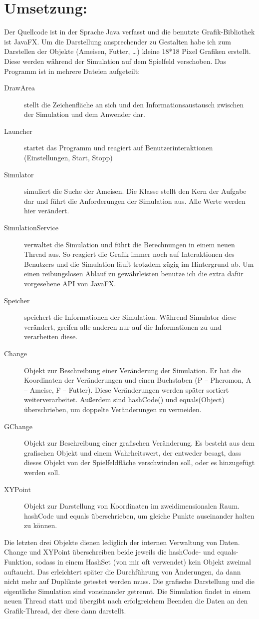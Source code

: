 \documentclass[a4paper,12pt]{scrartcl}
\begin{document}
\section*{Umsetzung:}
Der Quellcode ist in der Sprache Java verfasst und die benutzte Grafik-Bibliothek ist JavaFX.
Um die Darstellung ansprechender zu Gestalten habe ich zum Darstellen der Objekte (Ameisen, Futter, \dots) kleine 18*18 Pixel Grafiken erstellt. Diese werden während der Simulation auf dem Spielfeld verschoben.
Das Programm ist in mehrere Dateien aufgeteilt:
\begin{description}
 \item[DrawArea] stellt die Zeichenfläche an sich und den Informationsaustausch zwischen der Simulation und dem Anwender dar.
 \item[Launcher] startet das Programm und reagiert auf Benutzerinteraktionen (Einstellungen, Start, Stopp)
 \item[Simulator] simuliert die Suche der Ameisen. Die Klasse stellt den Kern der Aufgabe dar und führt die Anforderungen der Simulation aus. Alle Werte werden hier verändert.
 \item[SimulationService] verwaltet die Simulation und führt die Berechnungen in einem neuen Thread aus. So reagiert die Grafik immer noch auf Interaktionen des Benutzers und die Simulation läuft trotzdem zügig im Hintergrund ab. Um einen reibungslosen Ablauf zu gewährleisten benutze ich die extra dafür vorgesehene API von JavaFX.
 \item[Speicher] speichert die Informationen der Simulation. Während Simulator diese verändert, greifen alle anderen nur auf die Informationen zu und verarbeiten diese.
 \item[Change] Objekt zur Beschreibung einer Veränderung der Simulation. Er hat die Koordinaten der Veränderungen und einen Buchstaben (P -- Pheromon, A -- Ameise, F -- Futter). Diese Veränderungen werden später sortiert weiterverarbeitet. Außerdem sind hashCode() und equals(Object) überschrieben, um doppelte Veränderungen zu vermeiden.
 \item[GChange] Objekt zur Beschreibung einer grafischen Veränderung. Es besteht aus dem grafischen Objekt und einem Wahrheitswert, der entweder besagt, dass dieses Objekt von der Spielfeldfläche verschwinden soll, oder es hinzugefügt werden soll.
 \item[XYPoint] Objekt zur Darstellung von Koordinaten im zweidimensionalen Raum. hashCode und equals überschrieben, um gleiche Punkte auseinander halten zu können.
\end{description}
Die letzten drei Objekte dienen lediglich der internen Verwaltung von Daten. Change und XYPoint überschreiben beide jeweils die hashCode- und equals-Funktion, sodass in einem HashSet (von mir oft verwendet) kein Objekt zweimal auftaucht. Das erleichtert später die Durchführung von Änderungen, da dann nicht mehr auf Duplikate getestet werden muss.
Die grafische Darstellung und die eigentliche Simulation sind voneinander getrennt. Die Simulation findet in einem neuen Thread statt und übergibt nach erfolgreichem Beenden die Daten an den Grafik-Thread, der diese dann darstellt. 
\end{document}
